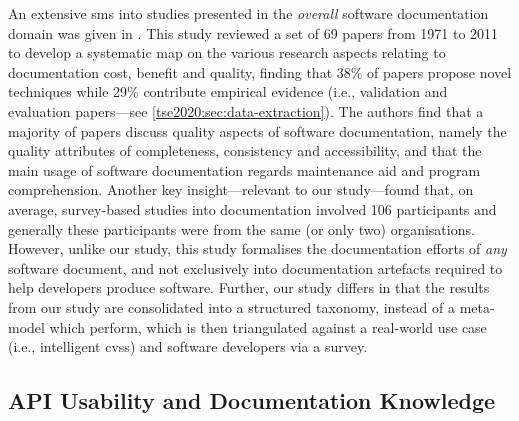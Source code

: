 An extensive \gls{sms} into studies presented in the \textit{overall} software documentation domain was given in \citet{ZHI2015175}. This study reviewed a set of 69 papers from 1971 to 2011 to develop a systematic map on the various research aspects relating to documentation cost, benefit and quality, finding that 38\% of papers propose novel techniques while 29\% contribute empirical evidence (i.e., validation and evaluation papers---see \cref{tse2020:sec:data-extraction}). The authors find that a majority of papers discuss quality aspects of software documentation, namely the quality attributes of completeness, consistency and accessibility, and that the main usage of software documentation regards maintenance aid and program comprehension. Another key insight---relevant to our study---found that, on average, survey-based studies into documentation involved 106 participants and generally these participants were from the same (or only two)  organisations. However, unlike our study, this study formalises the documentation efforts of \textit{any} software document, and not exclusively into  documentation artefacts required to help developers produce software. Further, our study differs in that the results from our study are consolidated into a structured taxonomy, instead of a meta-model which \citeauthor{ZHI2015175} perform, which is then triangulated against a real-world use case (i.e., intelligent \glspl{cvs}) and software developers via a survey.

\subsection{API Usability and Documentation Knowledge}

